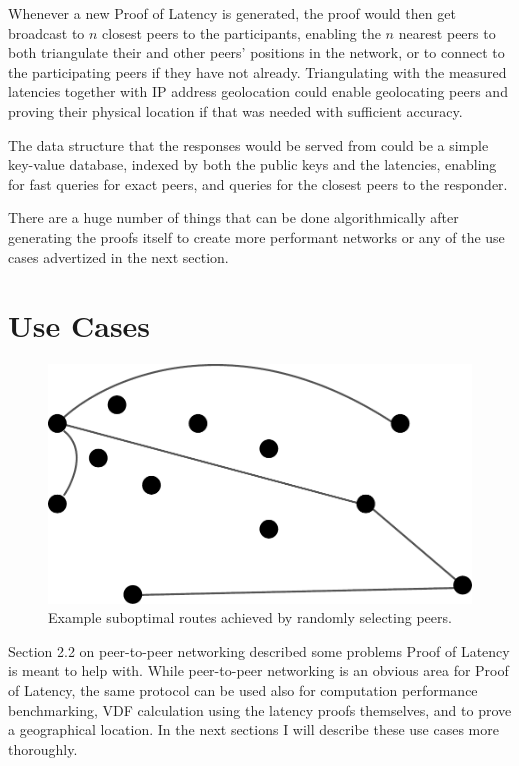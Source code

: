 Whenever a new Proof of Latency is generated, the proof would then get broadcast to \(n\) closest peers to the participants, enabling the \(n\) nearest peers to both triangulate their and other peers' positions in the network, or to connect to the participating peers if they have not already. Triangulating with the measured latencies together with IP address geolocation could enable geolocating peers and proving their physical location if that was needed with sufficient accuracy.~\cite{Katz-Bassett2006-zq}

The data structure that the responses would be served from could be a simple key-value database, indexed by both the public keys and the latencies, enabling for fast queries for exact peers, and queries for the closest peers to the responder.

There are a huge number of things that can be done algorithmically after generating the proofs itself to create more performant networks or any of the use cases advertized in the next section.

\section{Use Cases}
\begin{figure}
	\includegraphics[width=\textwidth]{pictures/random_routing.pdf}
	\caption{Example suboptimal routes achieved by randomly selecting peers.}
	\label{Subobtimal Topology}
\end{figure}
Section 2.2 on peer-to-peer networking described some problems Proof of Latency is meant to help with. While peer-to-peer networking is an obvious area for Proof of Latency, the same protocol can be used also for computation performance benchmarking, VDF calculation using the latency proofs themselves, and to prove a geographical location. In the next sections I will describe these use cases more thoroughly.

